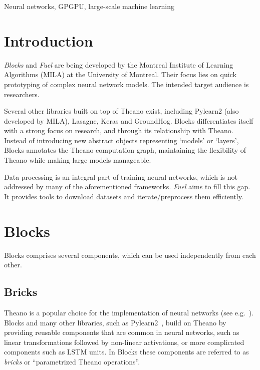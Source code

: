 \documentclass[twoside,11pt]{article}
\begin{document}
\begin{keywords}
  Neural networks, GPGPU, large-scale machine learning
\end{keywords}

\section{Introduction}

\emph{Blocks} and \emph{Fuel} are being developed by the Montreal Institute of
Learning Algorithms (MILA) at the University of Montreal. Their focus lies on
quick prototyping of complex neural network models. The intended target
audience is researchers.

Several other libraries built on top of Theano exist, including Pylearn2 (also
developed by MILA), Lasagne, Keras and GroundHog. Blocks differentiates itself
with a strong focus on research, and through its relationship with Theano.
Instead of introducing new abstract objects representing `models' or `layers',
Blocks annotates the Theano computation graph, maintaining the flexibility of
Theano while making large models manageable.

Data processing is an integral part of training neural networks, which is not
addressed by many of the aforementioned frameworks. \emph{Fuel} aims to fill
this gap. It provides tools to download datasets and iterate/preprocess them
efficiently.

\section{Blocks}

Blocks comprises several components, which can be used independently from each
other.

\subsection{Bricks}

Theano is a popular choice for the implementation of neural networks (see
e.g.~\cite{Goodfellow-et-al-ICML2013, Pascanu-et-al-ICML2013}). Blocks and many
other libraries, such as Pylearn2~\citep{pylearn2_arxiv_2013}, build on Theano
by providing reusable components that are common in neural networks, such as
linear transformations followed by non-linear activations, or more complicated
components such as LSTM units. In Blocks these components are referred to as
\emph{bricks} or ``parametrized Theano operations''.
\end{document}
